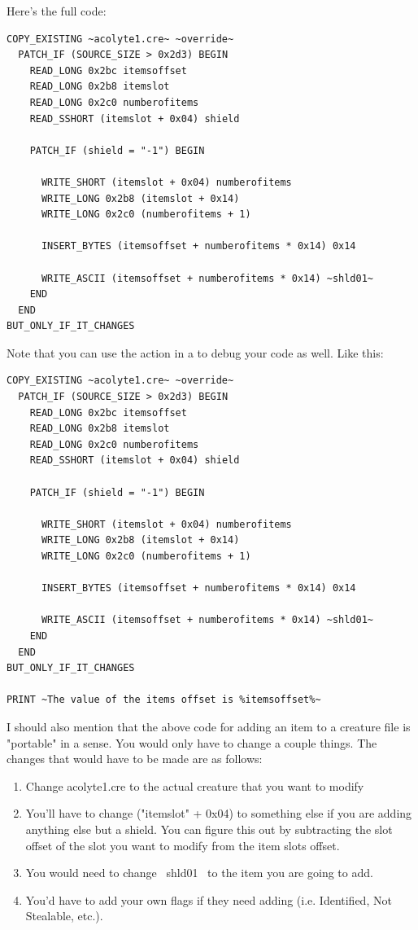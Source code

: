 \documentclass{article}
\def\ttref#1{\ahrefloc{#1}{\tt #1}}
\begin{document}
Here's the full code:

\begin{verbatim}
COPY_EXISTING ~acolyte1.cre~ ~override~
  PATCH_IF (SOURCE_SIZE > 0x2d3) BEGIN
    READ_LONG 0x2bc itemsoffset
    READ_LONG 0x2b8 itemslot
    READ_LONG 0x2c0 numberofitems
    READ_SSHORT (itemslot + 0x04) shield

    PATCH_IF (shield = "-1") BEGIN

      WRITE_SHORT (itemslot + 0x04) numberofitems
      WRITE_LONG 0x2b8 (itemslot + 0x14)
      WRITE_LONG 0x2c0 (numberofitems + 1)

      INSERT_BYTES (itemsoffset + numberofitems * 0x14) 0x14

      WRITE_ASCII (itemsoffset + numberofitems * 0x14) ~shld01~
    END
  END
BUT_ONLY_IF_IT_CHANGES
\end{verbatim}

Note that you can use the \ttref{PRINT} action in a \ttref{TP2} to debug
your code as well.  Like this:

\begin{verbatim}
COPY_EXISTING ~acolyte1.cre~ ~override~
  PATCH_IF (SOURCE_SIZE > 0x2d3) BEGIN
    READ_LONG 0x2bc itemsoffset
    READ_LONG 0x2b8 itemslot
    READ_LONG 0x2c0 numberofitems
    READ_SSHORT (itemslot + 0x04) shield

    PATCH_IF (shield = "-1") BEGIN

      WRITE_SHORT (itemslot + 0x04) numberofitems
      WRITE_LONG 0x2b8 (itemslot + 0x14)
      WRITE_LONG 0x2c0 (numberofitems + 1)

      INSERT_BYTES (itemsoffset + numberofitems * 0x14) 0x14

      WRITE_ASCII (itemsoffset + numberofitems * 0x14) ~shld01~
    END
  END
BUT_ONLY_IF_IT_CHANGES

PRINT ~The value of the items offset is %itemsoffset%~
\end{verbatim}

I should also mention that the above code for adding an item to a creature
file is "portable" in a sense.  You would only have to change a couple
things.  The changes that would have to be made are as follows:

\begin{enumerate}
\item Change acolyte1.cre to the actual creature that you want to modify
\item You'll have to change ("itemslot" + 0x04) to something else if you
are adding anything else but a shield.  You can figure this out by
subtracting the slot offset of the slot you want to modify from the item
slots offset.
\item You would need to change ~shld01~ to the item you are going to add.
\item You'd have to add your own flags if they need adding  (i.e.
Identified, Not Stealable, etc.).
\end{enumerate}
\end{document}
